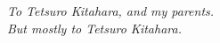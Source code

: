\noindent \textit{To Tetsuro Kitahara, and my parents.\\But mostly to Tetsuro Kitahara.}

\cleardoublepage